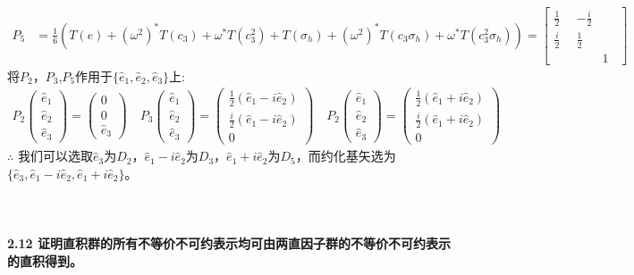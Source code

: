 \documentclass[12pt]{article}
\numberwithin{equation}{section}	 %
\begin{document}
\begin{spacing}{1.5}
\begin{align*}
P_{5} &= \frac{1}{6}\left( T(e) + (\omega^{2})^{*}T(c_{3}) + \omega^{*}T(c_{3}^{2}) + T(\sigma_{h}) + (\omega^{2})^{*}T(c_{3}\sigma_{h}) + \omega^{*}T(c_{3}^{2}\sigma_{h}) \right) = \begin{bmatrix} \frac{1}{2} & -\frac{i}{2} & \quad \\ \frac{i}{2} & \frac{1}{2} & \quad \\ \quad & \quad & 1\end{bmatrix}
\end{align*}
将$P_{2}$，$P_{3}$,$P_{5}$作用于$\{\hat{e}_{1}, \hat{e}_{2}, \hat{e}_{3}\}$上:
\begin{align*}
P_{2}\begin{pmatrix} \hat{e}_{1} \\ \hat{e}_{2} \\ \hat{e}_{3} \end{pmatrix} = \begin{pmatrix} 0 \\ 0 \\ \hat{e}_{3} \end{pmatrix} \quad
P_{3}\begin{pmatrix} \hat{e}_{1} \\ \hat{e}_{2} \\ \hat{e}_{3} \end{pmatrix} = \begin{pmatrix} \frac{1}{2}(\hat{e}_{1}-i\hat{e}_{2}) \\ \frac{i}{2}(\hat{e}_{1}-i\hat{e}_{2}) \\ 0 \end{pmatrix} \quad
P_{2}\begin{pmatrix} \hat{e}_{1} \\ \hat{e}_{2} \\ \hat{e}_{3} \end{pmatrix} = \begin{pmatrix} \frac{1}{2}(\hat{e}_{1}+i\hat{e}_{2}) \\ \frac{i}{2}(\hat{e}_{1}+i\hat{e}_{2}) \\ 0 \end{pmatrix}
\end{align*}
$\therefore$ 我们可以选取$\hat{e}_{3}$为$D_{2}$，$\hat{e}_{1}-i\hat{e}_{2}$为$D_{3}$，$\hat{e}_{1}+i\hat{e}_{2}$为$D_{5}$，而约化基矢选为$\{\hat{e}_{3}, \hat{e}_{1}-i\hat{e}_{2}, \hat{e}_{1}+i\hat{e}_{2}\}$。\\
~\\
~\\
~\\
\textbf{2.12 \quad 证明直积群的所有不等价不可约表示均可由两直因子群的不等价不可约表示的直积得到。}\\

\end{spacing}
\end{document}
